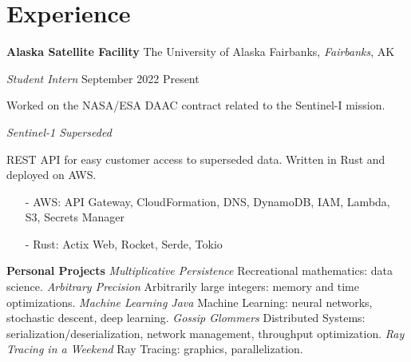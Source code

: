 ﻿\section{Experience}

\textbf{Alaska Satellite Facility}
\hfill
The University of Alaska Fairbanks, \textit{Fairbanks}, AK

\textit{Student Intern}
\hfill
{September 2022 \textendash\! Present}

\bigbreak

Worked on the NASA/ESA DAAC contract related to the Sentinel-I mission.

\bigbreak

\textit{Sentinel-1 Superseded}

REST API for easy customer access to superseded data. Written in Rust and deployed on AWS.

\begin{itemize}\setlength\itemsep{-0.15cm}
    \item [-] AWS: API Gateway, CloudFormation, DNS, DynamoDB, IAM, Lambda, S3, Secrets Manager
    \item [-] Rust: Actix Web, Rocket, Serde, Tokio
\end{itemize}

\textbf{Personal Projects}
\bigbreak
\textit{Multiplicative Persistence} \textendash\! Recreational mathematics: data science.
\bigbreak
\textit{Arbitrary Precision} \textendash\! Arbitrarily large integers: memory and time optimizations.
\bigbreak
\textit{Machine Learning Java} \textendash\! Machine Learning: neural networks, stochastic descent, deep learning.
\bigbreak
\textit{Gossip Glommers} \textendash\! Distributed Systems: serialization/deserialization, network management, throughput optimization.
\bigbreak
\textit{Ray Tracing in a Weekend} \textendash\! Ray Tracing: graphics, parallelization.